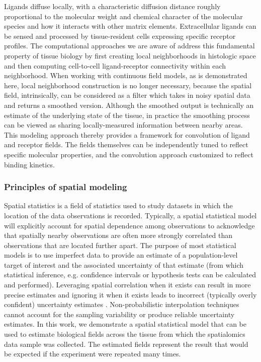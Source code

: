 \documentclass[10pt,letterpaper]{article}
\begin{document}
Ligands diffuse locally, with a characteristic diffusion distance roughly proportional to the molecular weight and chemical character of the molecular species and how it interacts with other matrix elements. Extracellular ligands can be sensed and processed by tissue-resident cells expressing specific receptor profiles. The computational approaches we are aware of address this fundamental property of tissue biology by first creating local neighborhoods in histologic space and then computing cell-to-cell ligand-receptor connectivity within each neighborhood. When working with continuous field models, as is demonstrated here, local neighborhood construction is no longer necessary, because the spatial field, intrinsically, can be considered as a filter which takes in noisy spatial data and returns a smoothed version. Although the smoothed output is technically an estimate of the underlying state of the tissue, in practice the smoothing process can be viewed as sharing locally-measured information between nearby areas. This modeling approach thereby provides a framework for convolution of ligand and receptor fields. The fields themselves can be independently tuned to reflect specific molecular properties, and the convolution approach customized to reflect binding kinetics.

\subsubsection*{Principles of spatial modeling}

Spatial statistics is a field of statistics used to study datasets in which the location of the data observations is recorded. Typically, a spatial statistical model will explicitly account for spatial dependence among observations to acknowledge that spatially nearby observations are often more strongly correlated than observations that are located further apart. The purpose of most statistical models is to use imperfect data to provide an estimate of a population-level target of interest and the associated uncertainty of that estimate (from which statistical inference, e.g. confidence intervals or hypothesis tests can be calculated and performed). Leveraging spatial correlation when it exists can result in more precise estimates and ignoring it when it exists leads to incorrect (typically overly confident) uncertainty estimates \cite{valcu2010}. Non-probabilistic interpolation techniques cannot account for the sampling variability or produce reliable uncertainty estimates. In this work, we demonstrate a spatial statistical model that can be used to estimate biological fields across the tissue from which the spatialomics data sample was collected. The estimated fields represent the result that would be expected if the experiment were repeated many times.
\end{document}
